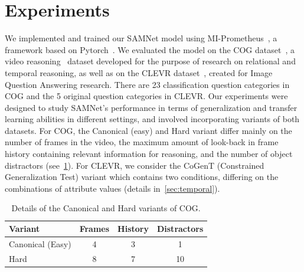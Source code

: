 \section{Experiments}
\label{sec:experiments}
We implemented and trained our SAMNet model using MI-Prometheus~\cite{kornuta2018accelerating}, a framework based on Pytorch~\cite{paszke2017automatic}. 
We evaluated the model on the COG dataset~\cite{yang2018dataset}, a video reasoning~\cite{mogadala2019trends} dataset developed for the purpose of research on relational and temporal reasoning, as well as on the CLEVR dataset~\cite{johnson2017clevr}, created for Image Question Answering research.
There are 23 classification question categories in COG and the 5 original question categories in CLEVR.
Our experiments were designed to study SAMNet's performance in terms of generalization and transfer learning abilities in different settings,
and involved incorporating variants of both datasets.  
For COG, the Canonical (easy) and Hard variant differ mainly on the number of frames in the video, 
the maximum amount of look-back in frame history containing relevant information for reasoning, 
and the number of object distractors (see~\cref{tab:cog_variants}).
For CLEVR, we consider the CoGenT (Constrained Generalization Test) variant which contains two conditions, differing on the combinations of attribute values (details in~\cref{sec:temporal}).
\begin{table}[ht]
	\centering
		\begin{tabular}{lccc}
			\toprule
			Variant	& Frames & History	& Distractors \\ 
			\midrule
			Canonical (Easy) & 4 & 3 & 1\\	
			Hard  & 8 & 7 & 10\\
			\bottomrule	
		\end{tabular}
	\caption{Details of the Canonical and Hard variants of COG.}
	\label{tab:cog_variants}
\end{table}\vspace{5pt}


